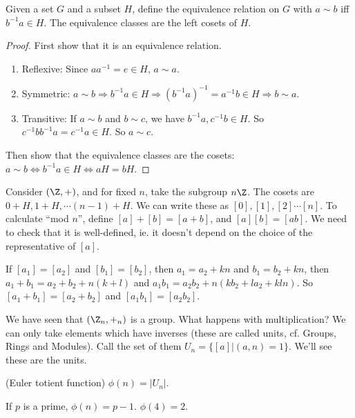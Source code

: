 \documentclass[a4paper]{article}
\begin{document}
\begin{lemma}
  Given a set $G$ and a subset $H$, define the equivalence relation on $G$ with $a\sim b$ iff $b^{-1}a\in H$. The equivalence classes are the left cosets of $H$.
\end{lemma}

\begin{proof}
  First show that it is an equivalence relation.
  \begin{enumerate}
    \item Reflexive: Since $aa^{-1} = e\in H$,  $a\sim a$.
    \item Symmetric: $a\sim b\Rightarrow b^{-1}a\in H \Rightarrow (b^{-1}a)^{-1} = a^{-1}b\in H\Rightarrow b\sim a$.
    \item Transitive: If $a\sim b$ and $b\sim c$, we have $b^{-1}a, c^{-1}b\in H$. So $c^{-1}bb^{-1}a = c^{-1}a\in H$. So $a\sim c$.
  \end{enumerate}
  Then show that the equivalence classes are the cosets: $a\sim b\Leftrightarrow b^{-1}a\in H \Leftrightarrow aH = bH$.
\end{proof}

\begin{eg}
  Consider $(\Z, +)$, and for fixed $n$, take the subgroup $n\Z$. The cosets are $0+ H, 1 + H, \cdots (n - 1)+H$. We can write these as $[0], [1], [2] \cdots [n]$. To calculate ``mod $n$'', define $[a] + [b] = [a + b]$, and $[a][b] = [ab]$. We need to check that it is well-defined, ie. it doesn't depend on the choice of the representative of $[a]$.

  If $[a_1] = [a_2]$ and $[b_1] = [b_2]$, then $a_1 = a_2 + kn$ and $b_1 = b_2 + kn$, then $a_1 + b_1 = a_2 + b_2 + n(k + l)$ and $a_1b_1 = a_2b_2 + n(kb_2 +la_2 + kln)$. So $[a_1 + b_1] = [a_2 + b_2]$ and $[a_1b_1] = [a_2b_2]$.
\end{eg}

We have seen that $(\Z_n, +_n)$ is a group. What happens with multiplication? We can only take elements which have inverses (these are called units, cf. Groups, Rings and Modules). Call the set of them $U_n = \{[a] | (a, n) = 1\}$. We'll see these are the units.
\begin{defi}
  (Euler totient function) $\phi (n) = |U_n|$.
\end{defi}

\begin{eg}
  If $p$ is a prime, $\phi(n) = p - 1$. $\phi(4) = 2$.
\end{eg}
\end{document}
